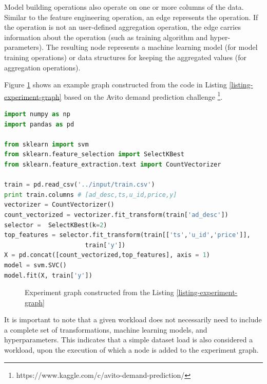 Model building operations also operate on one or more columns of the data.
Similar to the feature engineering operation, an edge represents the operation.
If the operation is not an user-defined aggregation operation, the edge carries information about the operation (such as training algorithm and hyper-parameters).
The resulting node represents a machine learning model (for model training operations) or data structures for keeping the aggregated values (for aggregation operations).

Figure \ref{fig-experiment-graph} shows an example graph constructed from the code in Listing \ref{listing-experiment-graph} based on the Avito demand prediction challenge \footnote{https://www.kaggle.com/c/avito-demand-prediction/}.

\begin{lstlisting}[language=Python, caption=Example script,captionpos=b,label = {listing-experiment-graph}]
import numpy as np
import pandas as pd

from sklearn import svm
from sklearn.feature_selection import SelectKBest
from sklearn.feature_extraction.text import CountVectorizer

train = pd.read_csv('../input/train.csv') 
print train.columns # [ad_desc,ts,u_id,price,y]
vectorizer = CountVectorizer()
count_vectorized = vectorizer.fit_transform(train['ad_desc'])
selector =  SelectKBest(k=2)
top_features = selector.fit_transform(train[['ts','u_id','price']], 
				      train['y'])
X = pd.concat([count_vectorized,top_features], axis = 1)
model = svm.SVC()
model.fit(X, train['y'])
\end{lstlisting}

\begin{figure}
\centering

\caption{Experiment graph constructed from the Listing \ref{listing-experiment-graph}}
\label{fig-experiment-graph}
\end{figure}

It is important to note that a given workload does not necessarily need to include a complete set of transformations, machine learning models, and hyperparameters.
This indicates that a simple dataset load is also considered a workload, upon the execution of which a node is added to the experiment graph.